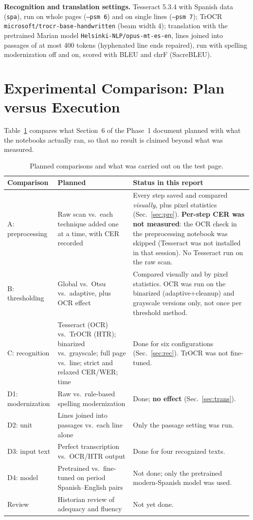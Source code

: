 \documentclass[10pt,twocolumn]{article}
\begin{document}
\textbf{Recognition and translation settings.} Tesseract 5.3.4 with Spanish data (\texttt{spa}), run on whole pages (\texttt{--psm 6}) and on single lines (\texttt{--psm 7}); TrOCR \texttt{microsoft/trocr-base-handwritten} (beam width 4); translation with the pretrained Marian model \texttt{Helsinki-NLP/opus-mt-es-en}, lines joined into passages of at most 400 tokens (hyphenated line ends repaired), run with spelling modernization off and on, scored with BLEU and chrF (SacreBLEU).

\section{Experimental Comparison: Plan versus Execution}
Table~\ref{tab:plan} compares what Section~6 of the Phase~1 document planned with what the notebooks actually ran, so that no result is claimed beyond what was measured.

\begin{table}[t]
\centering\small
\caption{Planned comparisons and what was carried out on the test page.}\label{tab:plan}
\begin{tabular}{@{}p{}p{}p{}@{}}
\toprule
\textbf{Comparison} & \textbf{Planned} & \textbf{Status in this report}\\
\midrule
A: preprocessing & Raw scan vs.\ each technique added one at a time, with CER recorded & Every step saved and compared \emph{visually}, plus pixel statistics (Sec.~\ref{sec:pre}). \textbf{Per-step CER was not measured}: the OCR check in the preprocessing notebook was skipped (Tesseract was not installed in that session). No Tesseract run on the raw scan.\\
B: thresholding & Global vs.\ Otsu vs.\ adaptive, plus OCR effect & Compared visually and by pixel statistics. OCR was run on the binarized (adaptive+cleanup) and grayscale versions only, not once per threshold method.\\
C: recognition & Tesseract (OCR) vs.\ TrOCR (HTR); binarized vs.\ grayscale; full page vs.\ line; strict and relaxed CER/WER; time & Done for six configurations (Sec.~\ref{sec:rec}). TrOCR was not fine-tuned.\\
D1: modernization & Raw vs.\ rule-based spelling modernization & Done; \textbf{no effect} (Sec.~\ref{sec:trans}).\\
D2: unit & Lines joined into passages vs.\ each line alone & Only the passage setting was run.\\
D3: input text & Perfect transcription vs.\ OCR/HTR output & Done for four recognized texts.\\
D4: model & Pretrained vs.\ fine-tuned on period Spanish--English pairs & Not done; only the pretrained modern-Spanish model was used.\\
Review & Historian review of adequacy and fluency & Not yet done.\\
\bottomrule
\end{tabular}
\end{table}
\end{document}
